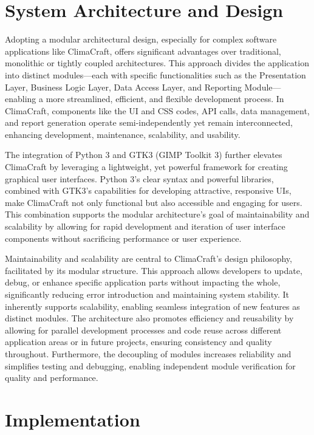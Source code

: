 \documentclass[sn-mathphys-num]{sn-jnl}%
\begin{document}
\section{System Architecture and Design}\label{sec2}

Adopting a modular architectural design, especially for complex software applications like ClimaCraft, offers significant advantages over traditional, monolithic or tightly coupled architectures. This approach divides the application into distinct modules—each with specific functionalities such as the Presentation Layer, Business Logic Layer, Data Access Layer, and Reporting Module—enabling a more streamlined, efficient, and flexible development process. In ClimaCraft, components like the UI and CSS codes, API calls, data management, and report generation operate semi-independently yet remain interconnected, enhancing development, maintenance, scalability, and usability.

The integration of Python 3 and GTK3 (GIMP Toolkit 3) further elevates ClimaCraft by leveraging a lightweight, yet powerful framework for creating graphical user interfaces. Python 3’s clear syntax and powerful libraries, combined with GTK3’s capabilities for developing attractive, responsive UIs, make ClimaCraft not only functional but also accessible and engaging for users. This combination supports the modular architecture's goal of maintainability and scalability by allowing for rapid development and iteration of user interface components without sacrificing performance or user experience.

Maintainability and scalability are central to ClimaCraft’s design philosophy, facilitated by its modular structure. This approach allows developers to update, debug, or enhance specific application parts without impacting the whole, significantly reducing error introduction and maintaining system stability. It inherently supports scalability, enabling seamless integration of new features as distinct modules. The architecture also promotes efficiency and reusability by allowing for parallel development processes and code reuse across different application areas or in future projects, ensuring consistency and quality throughout. Furthermore, the decoupling of modules increases reliability and simplifies testing and debugging, enabling independent module verification for quality and performance.

\section{Implementation}\label{sec3}
\end{document}

